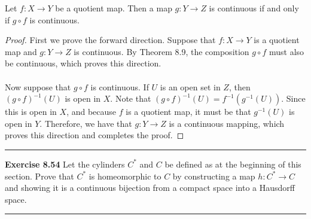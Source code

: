 \documentclass[letter,12pt,twoside]{hmcpset}
\begin{document}
\begin{problem}[Theorem 8.53]
    Let $f: X \rightarrow Y$ be a quotient map. Then a map $g : Y
    \rightarrow Z$ is continuous if and only if $g \circ f$ is continuous.
\end{problem}

\begin{proof}
    First we prove the forward direction. Suppose that $f: X
    \rightarrow Y$ is a quotient map and $g: Y \rightarrow Z$ is
    continuous. By Theorem 8.9, the composition $g \circ f$ must also
    be continuous, which proves this direction.
    \\
    \\
    Now suppose that $g \circ f$ is continuous. If $U$ is an open
    set in $Z$, then $(g \circ f)^{-1}(U)$ is open in $X$. Note that 
    $(g \circ f)^{-1}(U) = f^{-1}(g^{-1}(U))$. Since this is open in
    $X$, and because $f$ is a quotient map, it must be that
    $g^{-1}(U)$ is open in $Y$. Therefore, we have that $g: Y \to Z$
    is a continuous mapping, which proves this direction and completes
    the proof.
\end{proof}

\noindent\rule{18cm}{1pt}
\noindent 
\textbf{Exercise 8.54}
Let the cylinders $C^*$ and $C$ be defined as at the beginning of this
section. Prove that $C^*$ is homeomorphic to $C$ by constructing a map
$h : C^* \to C$ and showing it is a continuous bijection from a
compact space into a Hausdorff space. \\
\noindent\rule{18cm}{1pt}
\\
\end{document}
